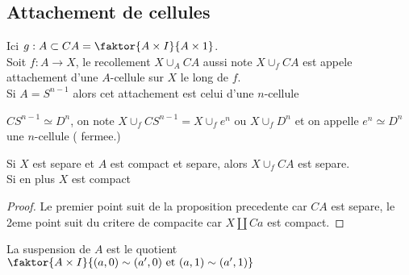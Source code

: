 \documentclass[../main.tex]{subfiles}
\begin{document}
\subsection{Attachement de cellules}
Ici $g: A \subset CA = \faktor { A\times I} { A\times 1}  $.\\
Soit $f:A\to X$, le recollement $X\cup_A CA$ aussi note $ X\cup_f CA$ est appele attachement d'une $A$-cellule sur $X$ le long de $f$.\\
Si $A= S^{n-1}$ alors cet attachement est celui d'une $n$-cellule
\begin{rmq}
$CS^{n-1}\simeq D^{n}$, on note $X\cup_f CS^{n-1}= X\cup_f e^{n}$ ou $X\cup_fD^{n}$ et on appelle $e^{n}\simeq D^{n}$ une $n$-cellule ( fermee.) 
\end{rmq}
\begin{propo}
Si $X$ est separe et $A$ est compact et separe, alors $X\cup_fCA$ est separe.\\
Si en plus $X$ est compact
\end{propo}
\begin{proof}
Le premier point suit de la proposition precedente car $CA$ est separe, le 2eme point suit du critere de compacite car $X\coprod Ca$ est compact.
\end{proof}
\begin{defn}[Suspension]
	La suspension de $A$ est le quotient $ \faktor { A\times I} { ( a,0) \sim ( a',0) \text{ et } ( a,1) \sim ( a',1) } $ 
\end{defn}
\end{document}
